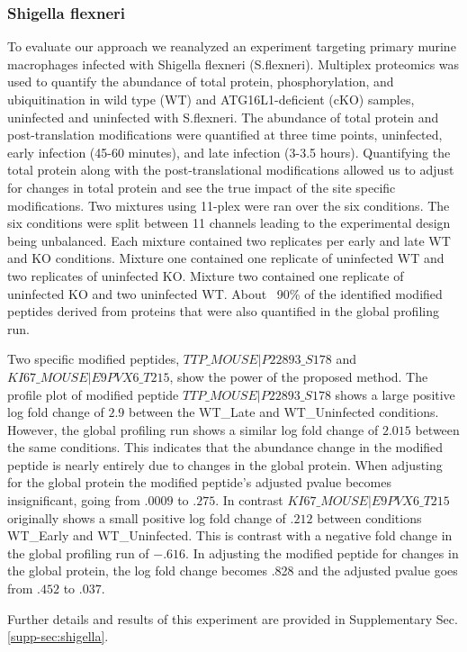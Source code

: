 \documentclass[mcp]{article}
\numberwithin{figure}{section} %
\numberwithin{table}{section}
\begin{document}
\subsubsection*{Shigella flexneri}
To evaluate our approach we reanalyzed an experiment targeting primary murine macrophages infected with Shigella flexneri (S.flexneri). \cite{Maculins} Multiplex proteomics was used to quantify the abundance of total protein, phosphorylation, and ubiquitination in wild type (WT) and ATG16L1-deficient (cKO) samples, uninfected and uninfected with S.flexneri. The abundance of total protein and post-translation modifications were quantified at three time points, uninfected, early infection (45-60 minutes), and late infection (3-3.5 hours). Quantifying the total protein along with the post-translational modifications allowed us to adjust for changes in total protein and see the true impact of the site specific modifications. Two mixtures using 11-plex were ran over the six conditions. The six conditions were split between 11 channels leading to the experimental design being unbalanced. Each mixture contained two replicates per early and late WT and KO conditions. Mixture one contained one replicate of uninfected WT and two replicates of uninfected KO. Mixture two contained one replicate of uninfected KO and two uninfected WT. About ~90\% of the identified modified peptides derived from proteins that were also quantified in the global profiling run.

Two specific modified peptides, $TTP\_MOUSE|P22893\_S178$ and $KI67\_MOUSE|E9PVX6\_T215$, show the power of the proposed method.  The profile plot of modified peptide $TTP\_MOUSE|P22893\_S178$ shows a large positive log fold change of $2.9$ between the WT\_Late and WT\_Uninfected conditions. However, the global profiling run shows a similar log fold change of $2.015$ between  the same conditions. This indicates that the abundance change in the modified peptide is nearly entirely due to changes in the global protein. When adjusting for the global protein the modified peptide's adjusted pvalue becomes insignificant, going from $.0009$ to $.275$. In contrast $KI67\_MOUSE|E9PVX6\_T215$ originally shows a small positive log fold change of $.212$ between conditions WT\_Early and WT\_Uninfected. This is contrast with a negative fold change in the global profiling run of $-.616$. In adjusting the modified peptide for changes in the global protein, the log fold change becomes .828 and the adjusted pvalue goes from $.452$ to $.037$.

Further details and results of this experiment are provided in Supplementary Sec. \ref{supp-sec:shigella}. 
\end{document}
